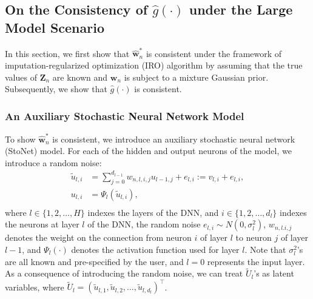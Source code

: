 \documentclass[11pt]{article}
\newcommand{\bZ}{{\boldsymbol Z}}
\newcommand{\bw}{{\boldsymbol w}}
\begin{document}
 
\subsection{On the Consistency of $\hat{g}(\cdot)$ under the Large Model Scenario} 
\label{sect:consistency}

In this section, we first show that $\hat{\bw}_n^*$ is consistent under the framework of 
imputation-regularized optimization (IRO) algorithm \citep{liang2018imputation} by assuming that 
the true values of $\bZ_n$ are known and 
$\bw_n$ is subject to a mixture Gaussian prior. Subsequently, we show that 
$\hat{g}(\cdot)$ is consistent. 

\subsubsection{An Auxiliary Stochastic Neural Network Model}
\label{auxNN}

To show  $\hat{\bw}_n^*$ is consistent, we introduce an auxiliary stochastic neural network (StoNet) model. For each of the hidden and output neurons of the model, we introduce a random noise: 
\begin{equation} \label{eq:stochastic}
 \begin{split} 
 \tilde{u}_{l,i} &=\sum_{j=0}^{d_{l-1}} w_{n,l,i,j} u_{l-1,j}+e_{l,i}:=v_{l,i}+e_{l,i}, \\ 
 u_{l,i} & =\Psi_l(\tilde{u}_{l,i}), \\ 
\end{split}
\end{equation} 
where $l \in \{1,2,\ldots,H\}$ indexes the layers of the DNN, and $i \in \{1,2,\ldots,d_l\}$  indexes the neurons at layer $l$ of the DNN, the random noise $e_{l,i} \sim N(0, \sigma_{l}^2)$, $w_{n,l.i,j}$ denotes the weight on the connection from neuron $i$ of layer $l$ to neuron $j$ of layer $l-1$,  and $\Psi_l(\cdot)$ denotes the activation function used for layer $l$. 
Note that $\sigma_{l}^2$'s are all known and pre-specified by the user, and $l=0$ represents the input layer. 
As a consequence of introducing the random noise, we can treat $\tilde{U}_l$'s 
as latent variables, where $\tilde{U}_l=(\tilde{u}_{l,1}, \tilde{u}_{l,2}, \ldots, 
\tilde{u}_{l,d_l})^{\top}$.  
\end{document}
